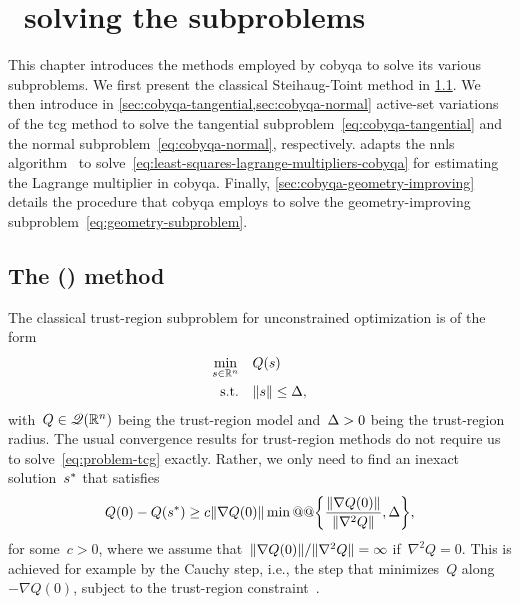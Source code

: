 %
%
%
\chapter{ \textemdash\ solving the subproblems}
\label{ch:cobyqa-subproblems}

This chapter introduces the methods employed by \gls{cobyqa} to solve its various subproblems.
We first present the classical Steihaug-Toint  method in \cref{sec:tcg}.
We then introduce in \cref{sec:cobyqa-tangential,sec:cobyqa-normal} active-set variations of the \gls{tcg} method to solve the tangential subproblem~\cref{eq:cobyqa-tangential} and the normal subproblem~\cref{eq:cobyqa-normal}, respectively.
 adapts the \gls{nnls} algorithm~\cite[Alg.~23.10]{Lawson_Hanson_1987} to solve~\cref{eq:least-squares-lagrange-multipliers-cobyqa} for estimating the Lagrange multiplier in \gls{cobyqa}.
Finally, \cref{sec:cobyqa-geometry-improving} details the procedure that \gls{cobyqa} employs to solve the geometry-improving subproblem~\cref{eq:geometry-subproblem}.

\section{The  () method}
\label{sec:tcg}

The classical trust-region subproblem for unconstrained optimization is of the form
\begin{subequations}
    \label{eq:problem-tcg}
    \begin{align}
        \min_{\sstep \in \R^n}  & \quad Q(\sstep)\\
        \text{s.t.}             & \quad \norm{\sstep} \le \rad,
    \end{align}
\end{subequations}
with~$Q \in \mathscr{Q}(\mathbb{R}^n)$ being the trust-region model and~$\rad > 0$ being the trust-region radius.
The usual convergence results for trust-region methods do not require us to solve~\cref{eq:problem-tcg} exactly.
Rather, we only need to find an inexact solution~$\sstep[\ast]$ that satisfies
\begin{equation*}
    Q(0) - Q(\sstep[\ast]) \ge c \norm{\nabla Q(0)} \min @@ \set[\bigg]{\frac{\norm{\nabla Q(0)}}{\norm{\nabla^2 Q}}, \rad},
\end{equation*}
for some~$c > 0$, where we assume that~$\lVert\nabla Q(0)\rVert / \lVert\nabla^2 Q\rVert = \infty$ if~$\nabla^2 Q = 0$.
This is achieved for example by the Cauchy step, i.e., the step that minimizes~$Q$ along~$-\nabla Q(0)$, subject to the trust-region constraint~\cite[Thm.~4]{Powell_1975b}.

